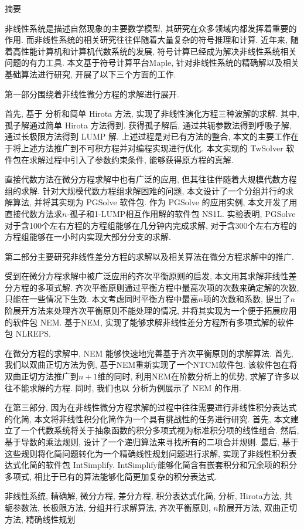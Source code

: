\clearpage
\thispagestyle{plain}
{}
\centerline{\heiti 摘\quad 要}

\linespread{1.4} \bigskip

非线性系统是描述自然现象的主要数学模型, 其研究在众多领域内都发挥着重要的作用. 而非线性系统的相关研究往往伴随着大量复杂的符号推理和计算. 近年来, 随着高性能计算机和计算机代数系统的发展, 符号计算已经成为解决非线性系统相关问题的有力工具. 本文基于符号计算平台Maple, 针对非线性系统的精确解以及相关基础算法进行研究, 开展了以下三个方面的工作. 

第一部分围绕着非线性微分方程的求解进行展开. 

首先, 基于 \Painleve{} 分析和简单 Hirota 方法, 实现了非线性演化方程三种波解的求解. 其中, 孤子解通过简单 Hirota 方法得到. 获得孤子解后, 通过共轭参数法得到呼吸子解, 通过长极限方法得到 LUMP 解. 上述过程是对已有方法的整合, 本文的主要工作在于将上述方法推广到不可积方程并对编程实现进行优化. 本文实现的 TwSolver 软件包在求解过程中引入了参数约束条件, 能够获得原方程的真解.  

直接代数方法在微分方程求解中也有广泛的应用, 但其往往伴随着大规模代数方程组的求解. 针对大规模代数方程组求解困难的问题, 本文设计了一个分组并行的求解算法, 并将其实现为 PGSolve 软件包. 作为 PGSolve 的应用实例, 本文开发了用直接代数方法求$n$-孤子和1-LUMP相互作用解的软件包 NS1L. 实验表明, PGSolve 对于含100个左右方程的方程组能够在几分钟内完成求解, 对于含300个左右方程的方程组能够在一小时内实现大部分分支的求解. 

第二部分主要研究非线性差分方程的求解以及相关算法在微分方程求解中的推广. 

受到在微分方程求解中被广泛应用的齐次平衡原则的启发, 本文用其求解非线性差分方程的多项式解. 齐次平衡原则通过平衡方程中最高次项的次数来确定解的次数, 只能在一些情况下生效. 本文考虑同时平衡方程中最高$n$项的次数和系数, 提出了$n$阶展开方法来处理齐次平衡原则不能处理的情况, 并将其实现为一个便于拓展应用的软件包 NEM. 基于NEM, 实现了能够求解非线性差分方程所有多项式解的软件包 NLREPS. 

在微分方程的求解中, NEM 能够快速地完善基于齐次平衡原则的求解算法. 首先, 我们以双曲正切方法为例, 基于NEM重新实现了一个NTCM软件包. 该软件包在将双曲正切方法推广到$n+1$维的同时, 利用NEM在阶数分析上的优势, 求解了许多以往不能求解的方程. 同时, 我们也以 \Painleve{} 分析为例展示了 NEM 的作用. 

在第三部分, 因为在非线性微分方程求解的过程中往往需要进行非线性积分表达式的化简, 本文将非线性积分化简作为一个具有挑战性的任务进行研究. 首先, 本文建立了一个代数系统将关于抽象函数的积分多项式视为标准积分项的线性组合. 然后, 基于导数的乘法规则, 设计了一个递归算法来寻找所有的二项合并规则. 最后, 基于这些规则将化简问题转化为一个精确线性规划问题进行求解, 实现了非线性积分表达式化简的软件包 IntSimplify.  IntSimplify能够化简含有嵌套积分和冗余项的积分多项式, 相比于已有的算法能够化简更加复杂的积分表达式. 

\bigskip

非线性系统, 精确解, 微分方程, 差分方程, 积分表达式化简, \Painleve{}分析, Hirota方法, 共轭参数法, 长极限方法, 分组并行求解算法, 齐次平衡原则, $n$阶展开方法, 双曲正切方法, 精确线性规划



